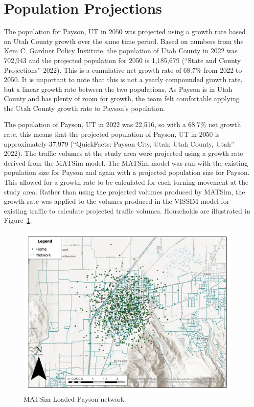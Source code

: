 \documentclass[
  letterpaper,
  DIV=11,
  numbers=noendperiod]{scrartcl}
\begin{document}
\hypertarget{population-projections}{%
\section{Population Projections}\label{population-projections}}

The population for Payson, UT in 2050 was projected using a growth rate
based on Utah County growth over the same time period. Based on numbers
from the Kem C. Gardner Policy Institute, the population of Utah County
in 2022 was 702,943 and the projected population for 2050 is 1,185,679
({``State and {County} {Projections}''} 2022). This is a cumulative net
growth rate of 68.7\% from 2022 to 2050. It is important to note that
this is not a yearly compounded growth rate, but a linear growth rate
between the two populations. As Payson is in Utah County and has plenty
of room for growth, the team felt comfortable applying the Utah County
growth rate to Payson's population.

The population of Payson, UT in 2022 was 22,516, so with a 68.7\% net
growth rate, this means that the projected population of Payson, UT in
2050 is approximately 37,979 ({``{QuickFacts}: {Payson} City, {Utah}:
{Utah} {County}, {Utah}''} 2022). The traffic volumes at the study area
were projected using a growth rate derived from the MATSim model. The
MATSim model was run with the existing population size for Payson and
again with a projected population size for Payson. This allowed for a
growth rate to be calculated for each turning movement at the study
area. Rather than using the projected volumes produced by MATSim, the
growth rate was applied to the volumes produced in the VISSIM model for
existing traffic to calculate projected traffic volumes. Households are
illustrated in Figure~\ref{fig-loaded-network}.

\begin{figure}

{\centering \includegraphics[width=4.6875in,height=\textheight]{matsim/Home.jpg}

}

\caption{\label{fig-loaded-network}MATSim Loaded Payson network}

\end{figure}
\end{document}
